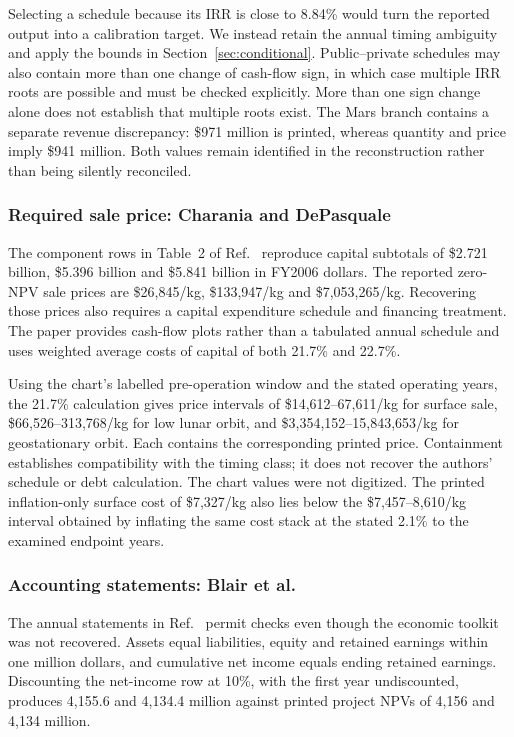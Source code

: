 \documentclass[final,5p,times,twocolumn]{elsarticle}
\begin{document}
Selecting a schedule because its IRR is close to 8.84\% would turn the reported output into a calibration target. We instead retain the annual timing ambiguity and apply the bounds in Section~\ref{sec:conditional}. Public--private schedules may also contain more than one change of cash-flow sign, in which case multiple IRR roots are possible and must be checked explicitly. More than one sign change alone does not establish that multiple roots exist. The Mars branch contains a separate revenue discrepancy: \$971 million is printed, whereas quantity and price imply \$941 million. Both values remain identified in the reconstruction rather than being silently reconciled.

\subsubsection{Required sale price: Charania and DePasquale}
The component rows in Table~2 of Ref.~\cite{charania2007} reproduce capital subtotals of \$2.721 billion, \$5.396 billion and \$5.841 billion in FY2006 dollars. The reported zero-NPV sale prices are \$26,845/kg, \$133,947/kg and \$7,053,265/kg. Recovering those prices also requires a capital expenditure schedule and financing treatment. The paper provides cash-flow plots rather than a tabulated annual schedule and uses weighted average costs of capital of both 21.7\% and 22.7\%.

Using the chart's labelled pre-operation window and the stated operating years, the 21.7\% calculation gives price intervals of \$14,612--67,611/kg for surface sale, \$66,526--313,768/kg for low lunar orbit, and \$3,354,152--15,843,653/kg for geostationary orbit. Each contains the corresponding printed price. Containment establishes compatibility with the timing class; it does not recover the authors' schedule or debt calculation. The chart values were not digitized. The printed inflation-only surface cost of \$7,327/kg also lies below the \$7,457--8,610/kg interval obtained by inflating the same cost stack at the stated 2.1\% to the examined endpoint years.

\subsubsection{Accounting statements: Blair et al.}
The annual statements in Ref.~\cite{blair2002} permit checks even though the economic toolkit was not recovered. Assets equal liabilities, equity and retained earnings within one million dollars, and cumulative net income equals ending retained earnings. Discounting the net-income row at 10\%, with the first year undiscounted, produces 4,155.6 and 4,134.4 million against printed project NPVs of 4,156 and 4,134 million.
\end{document}
